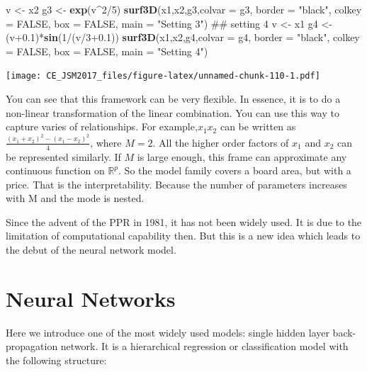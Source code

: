 \documentclass[]{book}
\newenvironment{Shaded}{\begin{snugshade}}{\end{snugshade}}
\newcommand{\KeywordTok}[1]{\textcolor[rgb]{0.13,0.29,0.53}{\textbf{{#1}}}}
\newcommand{\DataTypeTok}[1]{\textcolor[rgb]{0.13,0.29,0.53}{{#1}}}
\newcommand{\DecValTok}[1]{\textcolor[rgb]{0.00,0.00,0.81}{{#1}}}
\newcommand{\FloatTok}[1]{\textcolor[rgb]{0.00,0.00,0.81}{{#1}}}
\newcommand{\StringTok}[1]{\textcolor[rgb]{0.31,0.60,0.02}{{#1}}}
\newcommand{\OtherTok}[1]{\textcolor[rgb]{0.56,0.35,0.01}{{#1}}}
\newcommand{\NormalTok}[1]{{#1}}
\theoremstyle{definition}
\theoremstyle{definition}
\theoremstyle{remark}
\begin{document}
\begin{Shaded}
\begin{Highlighting}[]
\NormalTok{v <-}\StringTok{ }\NormalTok{x2}
\NormalTok{g3 <-}\StringTok{ }\KeywordTok{exp}\NormalTok{(v^}\DecValTok{2}\NormalTok{/}\DecValTok{5}\NormalTok{)}
\KeywordTok{surf3D}\NormalTok{(x1,x2,g3,}\DataTypeTok{colvar =} \NormalTok{g3, }\DataTypeTok{border =} \StringTok{"black"}\NormalTok{, }\DataTypeTok{colkey =} \OtherTok{FALSE}\NormalTok{, }\DataTypeTok{box =} \OtherTok{FALSE}\NormalTok{, }\DataTypeTok{main =} \StringTok{"Setting 3"}\NormalTok{)}
\NormalTok{## setting 4}
\NormalTok{v <-}\StringTok{ }\NormalTok{x1}
\NormalTok{g4 <-}\StringTok{ }\NormalTok{(v}\FloatTok{+0.1}\NormalTok{)*}\KeywordTok{sin}\NormalTok{(}\DecValTok{1}\NormalTok{/(v/}\DecValTok{3}\FloatTok{+0.1}\NormalTok{))}
\KeywordTok{surf3D}\NormalTok{(x1,x2,g4,}\DataTypeTok{colvar =} \NormalTok{g4, }\DataTypeTok{border =} \StringTok{"black"}\NormalTok{, }\DataTypeTok{colkey =} \OtherTok{FALSE}\NormalTok{, }\DataTypeTok{box =} \OtherTok{FALSE}\NormalTok{, }\DataTypeTok{main =} \StringTok{"Setting 4"}\NormalTok{)}
\end{Highlighting}
\end{Shaded}

\texttt{[image: CE\_JSM2017\_files/figure-latex/unnamed-chunk-110-1.pdf]}

You can see that this framework can be very flexible. In essence, it is
to do a non-linear transformation of the linear combination. You can use
this way to capture varies of relationships. For example,\(x_{1}x_{2}\)
can be written as \(\frac{(x_{1}+x_{2})^{2}-(x_{1}-x_{2})^{2}}{4}\),
where \(M=2\). All the higher order factors of \(x_1\) and \(x_2\) can
be represented similarly. If \(M\) is large enough, this frame can
approximate any continuous function on \(\mathbb{R}^{p}\). So the model
family covers a board area, but with a price. That is the
interpretability. Because the number of parameters increases with M and
the mode is nested.

Since the advent of the PPR in 1981, it has not been widely used. It is
due to the limitation of computational capability then. But this is a
new idea which leads to the debut of the neural network model.

\section{Neural Networks}\label{neural-networks}

Here we introduce one of the most widely used models: single hidden
layer back-propagation network. It is a hierarchical regression or
classification model with the following structure:
\end{document}
